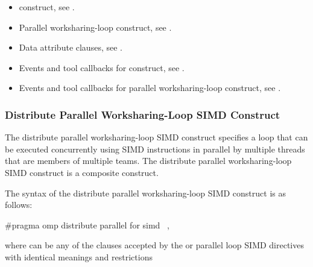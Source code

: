 \crossreferences
\begin{itemize}
\item {} construct, see
.

\item Parallel worksharing-loop construct, see
.

\item Data attribute clauses, see
.

\item Events and tool callbacks for  construct, see
.

\item Events and tool callbacks for parallel worksharing-loop construct, see
.

\end{itemize}






\subsubsection{Distribute Parallel Worksharing-Loop SIMD Construct}
\label{subsec:Distribute Parallel Worksharing-Loop SIMD Construct}
\summary
The distribute parallel worksharing-loop SIMD construct specifies a loop that can be executed
concurrently using SIMD instructions in parallel by multiple threads that are members
of multiple teams. The distribute parallel worksharing-loop SIMD construct is a composite construct.

\syntax
\begin{ccppspecific}
The syntax of the distribute parallel worksharing-loop SIMD construct is as follows:

\begin{ompcPragma}
#pragma omp distribute parallel for simd \
            \plc{[clause[ [},\plc{] clause] ... ] newline}
\end{ompcPragma}

where  can be any of the clauses accepted by the  or parallel loop
SIMD directives with identical meanings and restrictions
\end{ccppspecific}

